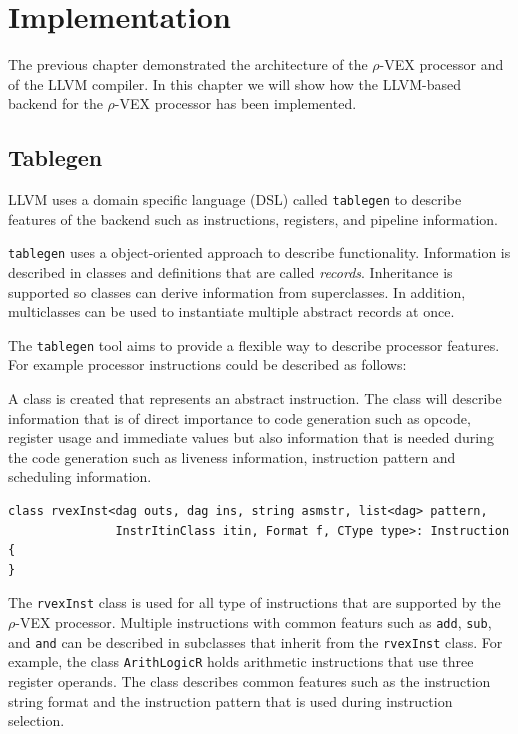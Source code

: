 \chapter{Implementation}
\label{chap:implementation}
The previous chapter demonstrated the architecture of the $\rho$-VEX processor and of the LLVM compiler. In this chapter we will show how the LLVM-based backend for the $\rho$-VEX processor has been implemented.

\section{Tablegen}
LLVM uses a domain specific language (DSL) called \texttt{tablegen} to describe features of the backend such as instructions, registers, and pipeline information. 

\texttt{tablegen} uses a object-oriented approach to describe functionality. Information is described in classes and definitions that are called \emph{records}. Inheritance is supported so classes can derive information from superclasses. In addition, multiclasses can be used to instantiate multiple abstract records at once.

The \texttt{tablegen} tool aims to provide a flexible way to describe processor features. For example processor instructions could be described as follows:

A class is created that represents an abstract instruction. The class will describe information that is of direct importance to code generation such as opcode, register usage and immediate values but also information that is needed during the code generation such as liveness information, instruction pattern and scheduling information.

\begin{lstlisting}[language=tblgen]
class rvexInst<dag outs, dag ins, string asmstr, list<dag> pattern,
               InstrItinClass itin, Format f, CType type>: Instruction
{
}
\end{lstlisting}

The \texttt{rvexInst} class is used for all type of instructions that are supported by the $\rho$-VEX processor. Multiple instructions with common featurs such as \texttt{add}, \texttt{sub}, and \texttt{and} can be described in subclasses that inherit from the \texttt{rvexInst} class. For example, the class \texttt{ArithLogicR} holds arithmetic instructions that use three register operands. The class describes common features such as the instruction string format and the instruction pattern that is used during instruction selection.

